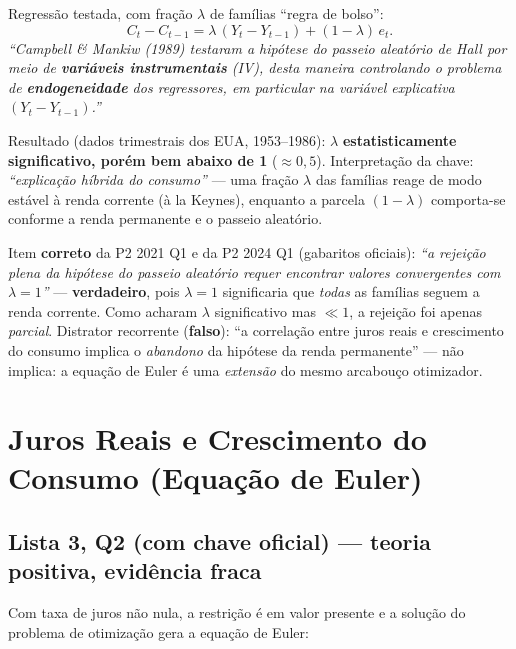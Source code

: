 \documentclass[12pt, a4paper]{article}
\begin{document}
\begin{correctbox}[title={Chave oficial (Q1c): o teste de Campbell e Mankiw}]
Regressão testada, com fração $\lambda$ de famílias ``regra de bolso'':
\[
C_t - C_{t-1} = \lambda\,(Y_t - Y_{t-1}) + (1-\lambda)\,e_t.
\]
\emph{``Campbell \& Mankiw (1989) testaram a hipótese do passeio aleatório de
Hall por meio de \textbf{variáveis instrumentais} (IV), desta maneira
controlando o problema de \textbf{endogeneidade} dos regressores, em particular
na variável explicativa $(Y_t - Y_{t-1})$.''}

Resultado (dados trimestrais dos EUA, 1953--1986): $\lambda$
\textbf{estatisticamente significativo, porém bem abaixo de 1}
($\approx 0{,}5$). Interpretação da chave: \emph{``explicação híbrida do
consumo''} --- uma fração $\lambda$ das famílias reage de modo estável à renda
corrente (à la Keynes), enquanto a parcela $(1-\lambda)$ comporta-se conforme
a renda permanente e o passeio aleatório.
\end{correctbox}

\begin{provabox}[title={Como cai na prova}]
Item \textbf{correto} da P2 2021 Q1 e da P2 2024 Q1 (gabaritos oficiais):
\emph{``a rejeição plena da hipótese do passeio aleatório requer encontrar
valores convergentes com $\lambda = 1$''} --- \textbf{verdadeiro}, pois
$\lambda = 1$ significaria que \emph{todas} as famílias seguem a renda
corrente. Como acharam $\lambda$ significativo mas $\ll 1$, a rejeição foi
apenas \emph{parcial}. Distrator recorrente (\textbf{falso}): ``a correlação
entre juros reais e crescimento do consumo implica o \emph{abandono} da
hipótese da renda permanente'' --- não implica: a equação de Euler é uma
\emph{extensão} do mesmo arcabouço otimizador.
\end{provabox}

\section{Juros Reais e Crescimento do Consumo (Equação de Euler)}

\subsection{Lista 3, Q2 (com chave oficial) --- teoria positiva, evidência fraca}

Com taxa de juros não nula, a restrição é em valor presente e a solução do
problema de otimização gera a equação de Euler:
\end{document}
